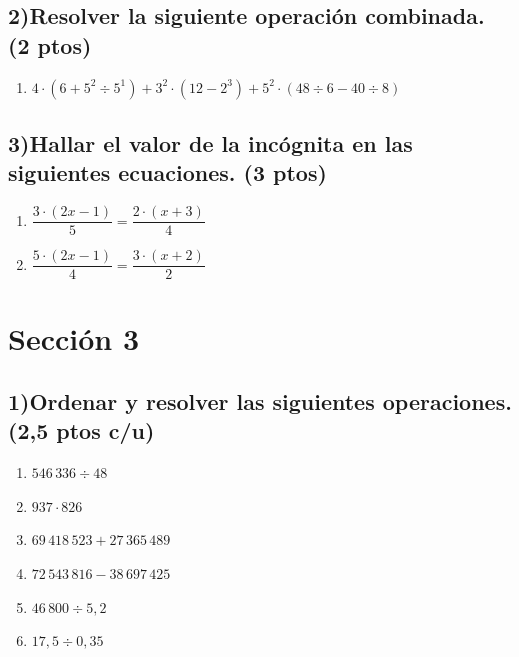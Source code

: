 \documentclass[12pt, letterpaper]{article}
\begin{document}
\vspace{6pt}

\subsection*{2)\quad Resolver la siguiente operación combinada. \hfill\normalfont\small (2 ptos)}
\begin{enumerate}[label=\alph*), leftmargin=*]
  \item $4 \cdot (6 + 5^2 \div 5^1) + 3^2 \cdot (12 - 2^3) + 5^2 \cdot (48 \div 6 - 40 \div 8)$
\end{enumerate}

\vspace{6pt}

\subsection*{3)\quad Hallar el valor de la incógnita en las siguientes ecuaciones. \hfill\normalfont\small (3 ptos)}
\begin{enumerate}[label=\alph*), leftmargin=*]
  \item $\dfrac{3 \cdot (2x - 1)}{5} = \dfrac{2 \cdot (x + 3)}{4}$
  \item $\dfrac{5 \cdot (2x - 1)}{4} = \dfrac{3 \cdot (x + 2)}{2}$
\end{enumerate}

\newpage

\section{Sección 3}

\subsection*{1)\quad Ordenar y resolver las siguientes operaciones. \hfill\normalfont\small (2{,}5 ptos c/u)}
\begin{enumerate}[label=\alph*), leftmargin=*]
  \item $546\,336 \div 48$
  \item $937 \cdot 826$
  \item $69\,418\,523 + 27\,365\,489$
  \item $72\,543\,816 - 38\,697\,425$
  \item $46\,800 \div 5{,}2$
  \item $17{,}5 \div 0{,}35$
\end{enumerate}
\end{document}
